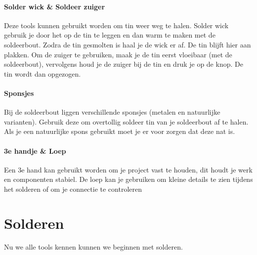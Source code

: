 \documentclass{guide}
\begin{document}
\paragraph{Solder wick \& Soldeer zuiger}
Deze tools kunnen gebruikt worden om tin weer weg te halen. Solder wick gebruik je door het op de tin te leggen en dan warm te maken met de soldeerbout. Zodra de tin gesmolten is haal je de wick er af. De tin blijft hier aan plakken. Om de zuiger te gebruiken, maak je de tin eerst vloeibaar (met de soldeerbout), vervolgens houd je de zuiger bij de tin en druk je op de knop. De tin wordt dan opgezogen.

\paragraph{Sponsjes}
Bij de soldeerbout liggen verschillende sponsjes (metalen en natuurlijke varianten). Gebruik deze om overtollig soldeer tin van je soldeerbout af te halen. Als je een natuurlijke spons gebruikt moet je er voor zorgen dat deze nat is.

\paragraph{3e handje \& Loep}
Een 3e hand kan gebruikt worden om je project vast te houden, dit houdt je werk en componenten stabiel. De loep kan je gebruiken om kleine details te zien tijdens het solderen of om je connectie te controleren

\newpage
\section{Solderen}
Nu we alle tools kennen kunnen we beginnen met solderen.\\
\end{document}
